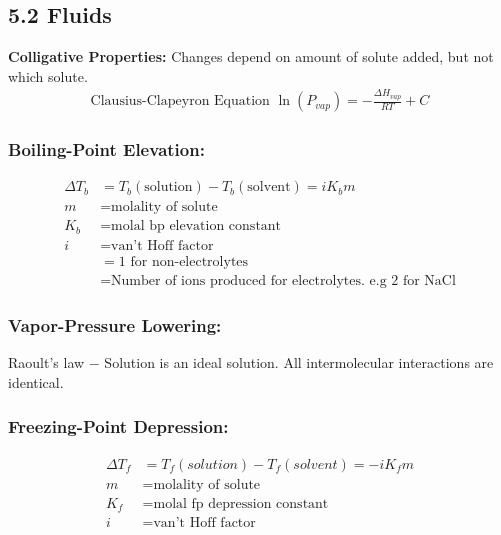 \subsection{5.2 Fluids}
    \textbf{Colligative Properties: }Changes depend on amount of solute added, but not which solute.\\
    \begin{align*}
        \textrm{Clausius-Clapeyron Equation } \ln(P_{vap}) = - \frac{\Delta H_{vap}}{RT} + C
    \end{align*}
    
    \subsubsection{Boiling-Point Elevation: }
        \begin{align*}
            \Delta T_b & = T_b (\textrm{solution}) - T_b (\textrm{solvent}) = iK_b m\\
            m & = \text{molality of solute}\\
            K_b & = \text{molal bp elevation constant}\\
            i & = \text{van't Hoff factor}\\
            & = 1 \text{ for non-electrolytes}\\
            & = \text{Number of ions produced for electrolytes.\ e.g 2 for NaCl}
        \end{align*}
    
    \subsubsection{Vapor-Pressure Lowering: }
    
        Raoult's law $-$ Solution is an ideal solution. All intermolecular interactions are identical. 

    \subsubsection{Freezing-Point Depression: }
        \begin{align*}
            \Delta T_f & = T_f (solution) - T_f (solvent) = -iK_fm\\
            m & = \text{molality of solute}\\
            K_f & = \text{molal fp depression constant}\\
            i & = \text{van't Hoff factor}
        \end{align*}